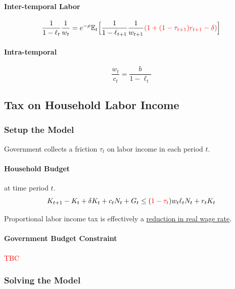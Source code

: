 \documentclass[11pt]{article}
\newcommand{\expat}[2]{\mathbb{E}_{#1}\Big[{#2}\Big]}
\begin{document}
			\paragraph{Inter-temporal Labor}
				\begin{equation}
					\frac{1}{1-\ell_t}\frac{1}{w_t} = e^{-\rho} \expat{t}{
						\frac{1}{1-\ell_{t+1}} \frac{1}{w_{t+1}} \textcolor{red}{(1 + (1-\tau_{t+1})r_{t+1} - \delta)}
					}
				\end{equation}
				
			\paragraph{Intra-temporal}
				\begin{equation}
					\frac{w_t}{c_t} = \frac{b}{1-\ell_t}
				\end{equation}

		\subsection{Tax on Household Labor Income}
			\subsubsection{Setup the Model}
			\begin{assumption}
				Government collects a friction $\tau_t$ on labor income in each period $t$.
			\end{assumption}
			
			\paragraph{Household Budget} at time period $t$.
				\begin{equation}
					K_{t+1} - K_t + \delta K_t + c_t N_t + G_t \leq (\textcolor{red}{1-\tau_t}) w_t \ell_t N_t + r_t K_t	
				\end{equation}
			
			\begin{remark}[Interpretation]
				Proportional labor income tax is effectively a \ul{reduction in real wage rate}.
			\end{remark}
				
			\paragraph{Government Budget Constraint} \textcolor{red}{TBC}
			
			\subsubsection{Solving the Model}
\end{document}
